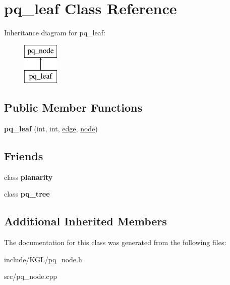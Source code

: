 \hypertarget{classpq__leaf}{}\section{pq\+\_\+leaf Class Reference}
\label{classpq__leaf}
Inheritance diagram for pq\+\_\+leaf\+:\begin{figure}[H]
\begin{center}
\leavevmode
\includegraphics[height=2.000000cm]{classpq__leaf}
\end{center}
\end{figure}
\subsection*{Public Member Functions}
\begin{DoxyCompactItemize}
\item 
\mbox{\label{classpq__leaf_a5478f8f28b4661ec404c492a01ac1f34}} 
{\bfseries pq\+\_\+leaf} (int, int, \mbox{\hyperlink{classedge}{edge}}, \mbox{\hyperlink{classnode}{node}})
\end{DoxyCompactItemize}
\subsection*{Friends}
\begin{DoxyCompactItemize}
\item 
\mbox{\label{classpq__leaf_ab6a02224dbc06343d95919289aec77c8}} 
class {\bfseries planarity}
\item 
\mbox{\label{classpq__leaf_a0a5be4bb438c891059fae98f607f2a9c}} 
class {\bfseries pq\+\_\+tree}
\end{DoxyCompactItemize}
\subsection*{Additional Inherited Members}


The documentation for this class was generated from the following files\+:\begin{DoxyCompactItemize}
\item 
include/\+K\+G\+L/pq\+\_\+node.\+h\item 
src/pq\+\_\+node.\+cpp\end{DoxyCompactItemize}
